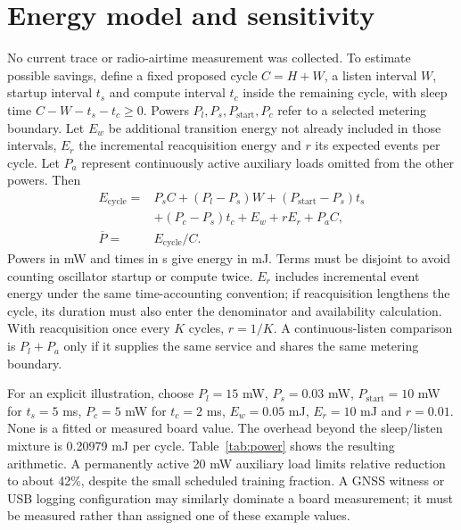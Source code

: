 \documentclass[11pt,letterpaper]{article}
\begin{document}
\section{Energy model and sensitivity}\label{sec:energy}
No current trace or radio-airtime measurement was collected. To estimate possible savings, define a fixed proposed cycle $C=H+W$, a listen interval $W$, startup interval $t_s$ and compute interval $t_c$ inside the remaining cycle, with sleep time $C-W-t_s-t_c\ge0$. Powers $P_l,P_s,P_{\mathrm{start}},P_c$ refer to a selected metering boundary. Let $E_w$ be additional transition energy not already included in those intervals, $E_r$ the incremental reacquisition energy and $r$ its expected events per cycle. Let $P_a$ represent continuously active auxiliary loads omitted from the other powers. Then
\begin{align}
 E_{\mathrm{cycle}}={}&P_s C+(P_l-P_s)W+(P_{\mathrm{start}}-P_s)t_s\nonumber\\
 &+(P_c-P_s)t_c+E_w+rE_r+P_a C,\label{eq:energy}\\
 \overline{P}={}&E_{\mathrm{cycle}}/C.\label{eq:pavg}
\end{align}
Powers in mW and times in s give energy in mJ. Terms must be disjoint to avoid counting oscillator startup or compute twice. $E_r$ includes incremental event energy under the same time-accounting convention; if reacquisition lengthens the cycle, its duration must also enter the denominator and availability calculation. With reacquisition once every $K$ cycles, $r=1/K$. A continuous-listen comparison is $P_l+P_a$ only if it supplies the same service and shares the same metering boundary.

For an explicit illustration, choose $P_l=15$ mW, $P_s=0.03$ mW, $P_{\mathrm{start}}=10$ mW for $t_s=5$ ms, $P_c=5$ mW for $t_c=2$ ms, $E_w=0.05$ mJ, $E_r=10$ mJ and $r=0.01$. None is a fitted or measured board value. The overhead beyond the sleep/listen mixture is 0.20979 mJ per cycle. Table~\ref{tab:power} shows the resulting arithmetic. A permanently active 20 mW auxiliary load limits relative reduction to about 42\%, despite the small scheduled training fraction. A GNSS witness or USB logging configuration may similarly dominate a board measurement; it must be measured rather than assigned one of these example values.
\end{document}
